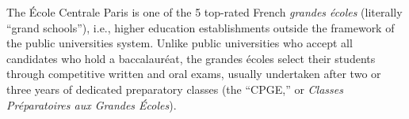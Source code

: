 \documentclass[11pt,a4paper]{moderncv}
\begin{document}

\flushleft
\footnotemark[1] \small{The \'{E}cole Centrale Paris is one of the 5 top-rated French \textit{grandes écoles} (literally ``grand schools''), i.e., higher education establishments outside the framework of the public universities system. Unlike public universities who accept all candidates who hold a baccalauréat, the grandes écoles select their students through competitive written and oral exams, usually undertaken after two or three years of dedicated preparatory classes (the ``CPGE,'' or \textit{Classes Préparatoires aux Grandes Écoles})}.

%
\end{document}
